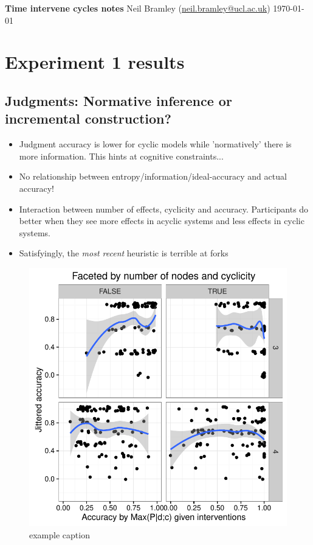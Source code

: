 \documentclass[12pt]{article}
\begin{document}
\begin{center} 
{\LARGE \textbf{Time intervene cycles notes}}
\linebreak
\linebreak
{\large Neil Bramley (\href{mailto:neil.bramley@ucl.ac.uk}{neil.bramley@ucl.ac.uk})}
\linebreak
\today
\end{center} 

\section{Experiment 1 results}

\FloatBarrier

\subsection{Judgments: Normative inference or incremental construction?}


\begin{itemize}
  \item Judgment accuracy is lower for cyclic models while 'normatively' there is more information.  This hints at cognitive constraints...
  \item No relationship between entropy/information/ideal-accuracy and actual accuracy!
  \item Interaction between number of effects, cyclicity and accuracy.  Participants do better when they see more effects in acyclic systems and less effects in cyclic systems.
  \item Satisfyingly, the \emph{most recent} heuristic is terrible at forks
\end{itemize}

\begin{figure}[H]
   \centering
   \includegraphics[width = .5\columnwidth]{information_accuracy_relationship}
   \caption{example caption}
   \label{fig:information_accuracy_relationship}
\end{figure}
\end{document}
